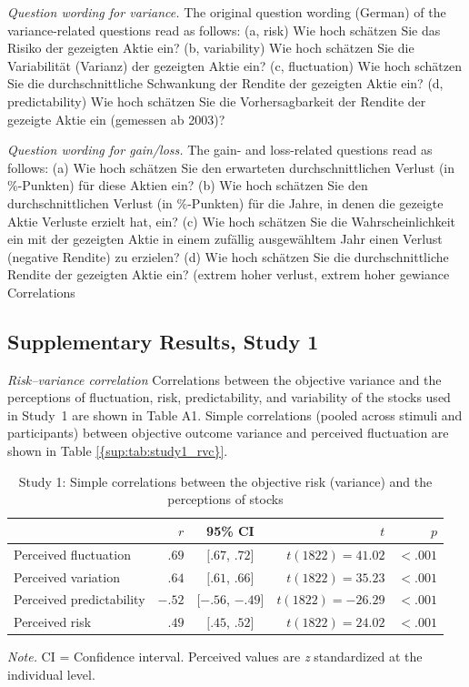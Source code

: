 \textit{Question wording for variance.} The original question wording (German) of the variance-related questions read as follows: (a, risk) Wie hoch schätzen Sie das Risiko der gezeigten Aktie ein?  (b, variability) Wie hoch schätzen Sie die Variabilität (Varianz) der gezeigten Aktie ein? (c, fluctuation) Wie hoch schätzen Sie die durchschnittliche Schwankung der Rendite der gezeigten Aktie ein? (d, predictability) Wie hoch schätzen Sie die Vorhersagbarkeit der Rendite der gezeigte Aktie ein (gemessen ab 2003)?

\textit{Question wording for gain/loss.} The gain- and loss-related questions read as follows: (a) Wie hoch schätzen Sie den erwarteten durchschnittlichen Verlust (in \%-Punkten) für diese Aktien ein? (b) Wie hoch schätzen Sie den durchschnittlichen Verlust (in \%-Punkten) für die Jahre, in denen die gezeigte Aktie Verluste erzielt hat, ein? (c) Wie hoch schätzen Sie die Wahrscheinlichkeit ein mit der gezeigten Aktie in einem zufällig ausgewähltem Jahr einen Verlust (negative Rendite) zu erzielen? (d) Wie hoch schätzen Sie die durchschnittliche Rendite der gezeigten Aktie ein? (extrem hoher verlust, extrem hoher gewiance Correlations

\subsection{Supplementary Results, Study 1}
\label{study1_supplementary_results}
\textit{Risk--variance correlation}
\label{study1_risk-variance-correlation}
Correlations between the objective variance and the perceptions of fluctuation, risk, predictability, and variability of the stocks used in Study~1 are shown in Table A1. Simple correlations (pooled across stimuli and participants) between objective outcome variance and perceived fluctuation are shown in Table \ref{{sup:tab:study1_rvc}}.
\begin{table}[]
    \centering
    \begin{threeparttable}
    \caption{Study 1: Simple correlations between the objective risk (variance) and the perceptions of stocks}
    \label{sup:tab:study1_rvc}
    \begin{tabular}{lrcrr}\toprule
         & $r$ &  95\% CI & $t$ & $p$ \\
          \midrule
        Perceived fluctuation & $.69$ & $[.67$, $.72]$ & $t(1822) = 41.02$ & $< .001$ \\
        Perceived variation & $.64$ & $[.61$, $.66]$ &  $t(1822) = 35.23$ & $< .001$\\
        Perceived predictability & $-.52$ &  $[-.56$, $-.49]$ & $t(1822) = -26.29$ &  $< .001$\\
        Perceived risk & $.49$ & $[.45$, $.52]$ & $t(1822) = 24.02$ & $< .001$\\
        \bottomrule
    \end{tabular}
    \begin{tablenotes}
    \textit{Note.} CI = Confidence interval. Perceived values are \textit{z} standardized at the individual level.
    \end{tablenotes}
    \end{threeparttable}
\end{table}

